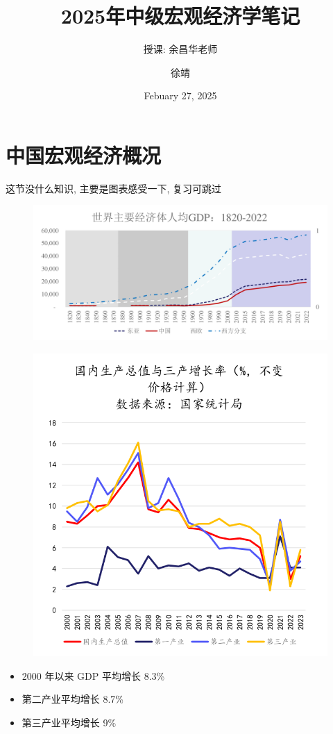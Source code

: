 \documentclass[lang=cn,10pt,green]{elegantbook}
\title{2025年中级宏观经济学笔记}
\subtitle{授课: 余昌华老师}
\author{徐靖}
\institute{PKU}
\date{Febuary 27, 2025}
\begin{document}
\maketitle
\frontmatter

\tableofcontents

\mainmatter

\chapter{中国宏观经济概况}

这节没什么知识, 主要是图表感受一下, 复习可跳过

\begin{figure}[htbp]
    \centering
    \includegraphics[width=0.8\linewidth]{image/世界主要经济体人均.png}
\end{figure}

\begin{figure}[htbp]
    \centering
    \includegraphics[width=0.5\linewidth]{image/国内生产总值与三产增长率1.png}
\end{figure}

\begin{itemize}
    \item 2000 年以来 GDP 平均增长 8.3\%
    \item 第二产业平均增长 8.7\%
    \item 第三产业平均增长 9\%
\end{itemize}
\end{document}
